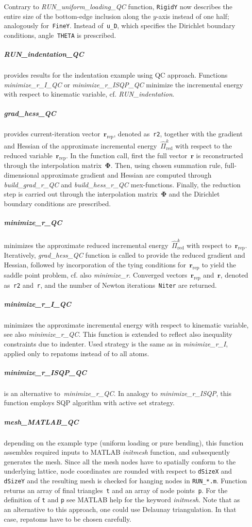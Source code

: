 \documentclass[preprint,12pt,authoryear]{elsarticle}
\newcommand{\bs}[1]{{\boldsymbol{#1}}}
\begin{document}
Contrary to \emph{RUN\_uniform\_loading\_QC} function, \texttt{RigidY} now describes the entire size of the bottom-edge inclusion along the $y$-axis instead of one half; analogously for~\texttt{FineY}. Instead of~\texttt{u\_D}, which specifies the Dirichlet boundary conditions, angle~\texttt{THETA} is prescribed. 
%
%
\subparagraph{RUN\_indentation\_QC} provides results for the indentation example using QC approach. Functions \emph{minimize\_r\_I\_QC} or \emph{minimize\_r\_ISQP\_QC} minimize the incremental energy with respect to kinematic variable, cf. \emph{RUN\_indentation}.
%
%
\subparagraph{grad\_hess\_QC} provides current-iteration vector~$\bs{r}_\mathrm{rep}$, denoted as~\texttt{r2}, together with the gradient and Hessian of the approximate incremental energy~$\widehat{\Pi}^k_\mathrm{red}$ with respect to the reduced variable~$\bs{r}_\mathrm{rep}$. In the function call, first the full vector~$\bs{r}$ is reconstructed through the interpolation matrix~$\bs{\Phi}$. Then, using chosen summation rule, full-dimensional approximate gradient and Hessian are computed through \emph{build\_grad\_r\_QC} and \emph{build\_hess\_r\_QC} mex-functions. Finally, the reduction step is carried out through the interpolation matrix~$\bs{\Phi}$ and the Dirichlet boundary conditions are prescribed.
%
%
\subparagraph{minimize\_r\_QC} minimizes the approximate reduced incremental energy~$\widehat{\Pi}^k_\mathrm{red}$ with respect to~$\bs{r}_\mathrm{rep}$. Iteratively, \emph{grad\_hess\_QC} function is called to provide the reduced gradient and Hessian, followed by incorporation of the tying conditions for~$\bs{r}_\mathrm{rep}$ to yield the saddle point problem, cf. also \emph{minimize\_r}. Converged vectors~$\bs{r}_\mathrm{rep}$ and~$\bs{r}$, denoted as~\texttt{r2} and~\texttt{r}, and the number of Newton iterations~\texttt{Niter} are returned. 
%
%
\subparagraph{minimize\_r\_I\_QC} minimizes the approximate incremental energy with respect to kinematic variable, see also \emph{minimize\_r\_QC}. This function is extended to reflect also inequality constraints due to indenter. Used strategy is the same as in \emph{minimize\_r\_I}, applied only to repatoms instead of to all atoms.
%
%
\subparagraph{minimize\_r\_ISQP\_QC} is an alternative to~\emph{minimize\_r\_QC}. In analogy to \emph{minimize\_r\_ISQP}, this function employs SQP algorithm with active set strategy.
%
%
\subparagraph{mesh\_MATLAB\_QC} depending on the example type (uniform loading or pure bending), this function assembles required inputs to MATLAB \emph{initmesh} function, and subsequently generates the mesh. Since all the mesh nodes have to spatially conform to the underlying lattice, node coordinates are rounded with respect to \texttt{dSizeX} and \texttt{dSizeY} and the resulting mesh is checked for hanging nodes in \texttt{RUN\_*.m}. Function returns an array of final triangles~\texttt{t} and an array of node points~\texttt{p}. For the definition of \texttt{t} and \texttt{p} see MATLAB help for the keyword \emph{initmesh}. Note that as an alternative to this approach, one could use Delaunay triangulation. In that case, repatoms have to be chosen carefully.
\end{document}
